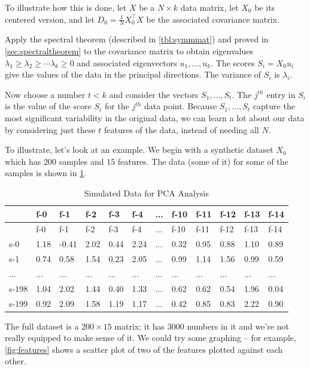 \documentclass[
]{article}
\begin{document}
To illustrate how this is done, let \(X\) be a \(N\times k\) data
matrix, let \(X_{0}\) be its centered version, and let
\(D_{0} = \frac{1}{N}X_{0}^{\intercal}X\) be the associated covariance
matrix.

Apply the spectral theorem (described in \cref{tbl:symmmat}) and proved
in \cref{sec:spectraltheorem} to the covariance matrix to obtain
eigenvalues \(\lambda_{1}\ge \lambda_{2}\ge\cdots \lambda_{k}\ge 0\) and
associated eigenvectors \(u_{1},\ldots, u_{k}\). The scores
\(S_{i}=X_{0}u_{i}\) give the values of the data in the principal
directions. The variance of \(S_{i}\) is \(\lambda_{i}\).

Now choose a number \(t<k\) and consider the vectors
\(S_{1},\ldots, S_{t}\). The \(j^{th}\) entry in \(S_{i}\) is the value
of the score \(S_{i}\) for the \(j^{th}\) data point. Because
\(S_{1},\ldots, S_{t}\) capture the most significant variability in the
original data, we can learn a lot about our data by considering just
these \(t\) features of the data, instead of needing all \(N\).

To illustrate, let's look at an example. We begin with a synthetic
dataset \(X_{0}\) which has \(200\) samples and \(15\) features. The
data (some of it) for some of the samples is shown in
\cref{tbl:rawdata}.

\begin{longtable}[]{@{}llllllllllll@{}}
\caption{Simulated Data for PCA Analysis
\label{tbl:rawdata}}\tabularnewline
\toprule
& f-0 & f-1 & f-2 & f-3 & f-4 & ... & f-10 & f-11 & f-12 & f-13 &
f-14\tabularnewline
\midrule
\endfirsthead
\toprule
& f-0 & f-1 & f-2 & f-3 & f-4 & ... & f-10 & f-11 & f-12 & f-13 &
f-14\tabularnewline
\midrule
\endhead
s-0 & 1.18 & -0.41 & 2.02 & 0.44 & 2.24 & ... & 0.32 & 0.95 & 0.88 &
1.10 & 0.89\tabularnewline
s-1 & 0.74 & 0.58 & 1.54 & 0.23 & 2.05 & ... & 0.99 & 1.14 & 1.56 & 0.99
& 0.59\tabularnewline
... & ... & ... & ... & ... & ... & ... & ... & ... & ... & ... &
...\tabularnewline
s-198 & 1.04 & 2.02 & 1.44 & 0.40 & 1.33 & ... & 0.62 & 0.62 & 0.54 &
1.96 & 0.04\tabularnewline
s-199 & 0.92 & 2.09 & 1.58 & 1.19 & 1.17 & ... & 0.42 & 0.85 & 0.83 &
2.22 & 0.90\tabularnewline
\bottomrule
\end{longtable}

The full dataset is a \(200\times 15\) matrix; it has \(3000\) numbers
in it and we're not really equipped to make sense of it. We could try
some graphing -- for example, \cref{fig:features} shows a scatter plot
of two of the features plotted against each other.
\end{document}
